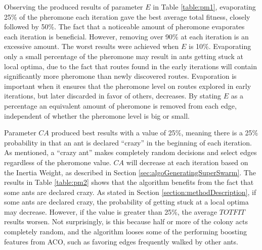 

Observing the produced results of parameter $E$ in Table \vref{table:pm1}, evaporating 25\% of the pheromone each iteration gave the best average total fitness, closely followed by 50\%. The fact that a noticeable amount of pheromone evaporates each iteration is beneficial. However, removing over 90\% at each iteration is an excessive amount. The worst results were achieved when $E$ is 10\%. Evaporating only a small percentage of the pheromone may result in ants getting stuck at local optima, due to the fact that routes found in the early iterations will contain significantly more pheromone than newly discovered routes. Evaporation is important when it ensures that the pheromone level on routes explored in early iterations, but later discarded in favor of others, decreases. By stating $E$ as a percentage an equivalent amount of pheromone is removed from each edge, independent of whether the pheromone level is big or small. 
\newline

Parameter $CA$ produced best results with a value of 25\%, meaning there is a 25\% probability in that an ant is declared ``crazy'' in the beginning of each iteration. As mentioned, a ``crazy ant'' makes completely random decisions and select edges regardless of the pheromone value. $CA$ will decrease at each iteration based on the Inertia Weight, as described in Section \vref{sec:algoGeneratingSuperSwarm}. The results in Table \vref{table:pm2} shows that the algorithm benefits from the fact that some ants are declared crazy. As stated in Section \vref{section:methodDescription}, if some ants are declared crazy, the probability of getting stuck at a local optima may decrease. However, if the value is greater than 25\%, the average $TOTFIT$ results worsen. Not surprisingly, is this because half or more of the colony acts completely random, and the algorithm looses some of the performing boosting features from ACO, such as favoring edges frequently walked by other ants. 
\newline

